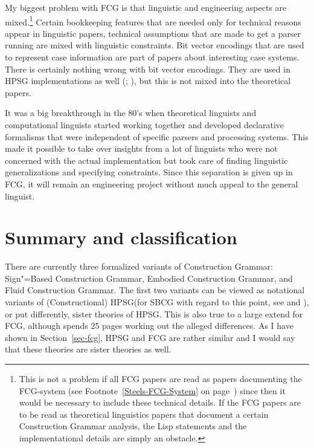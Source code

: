 
\addlines[2]
My biggest problem with FCG is that linguistic and engineering aspects are mixed.\footnote{
This is not a problem if all FCG papers are read as papers documenting the FCG-system (see
Footnote~\ref{Steels-FCG-System} on page~\pageref{Steels-FCG-System}) since then it
would be necessary to include these technical details. If the FCG papers are to be read as
theoretical linguistics papers that document a certain Construction Grammar analysis, the Lisp statements
and the implementational details are simply an obstacle.
} Certain bookkeeping features that are needed only
for technical reasons appear in linguistic papers, technical assumptions that are made to get a
parser running are mixed with linguistic constraints. Bit vector encodings that are used to
represent case information are part of papers about interesting case systems. There is certainly
nothing wrong with bit vector encodings. They are used in HPSG implementations as well
(\citealp[]{Reape91}; \citealp[]{Babel}), but this is
not mixed into the theoretical papers. 

It was a big breakthrough in the 80's when theoretical linguists and computational linguists started
working together and developed declarative formalisms that were independent of specific parsers and
processing systems. This made it possible to take over insights from a lot of linguists who were not
concerned with the actual implementation but took care of finding linguistic generalizations and
specifying constraints. Since this separation is given up in FCG, it will remain an engineering
project without much appeal to the general linguist.%
\indexhpsgend\indexsbcgend



\section{Summary and classification}

\begin{sloppypar}
There are currently three formalized variants of Construction Grammar: Sign"=Based Construction
Grammar, Embodied Construction Grammar, and Fluid Construction Grammar. The first two variants can
be viewed as notational variants of (Constructional) HPSG\indexhpsg (for SBCG with regard to this
point, see  and ), or put differently, sister
theories of HPSG. This is also true to a large extend for FCG, although \citet{vanTrijp2013a} spends
25 pages working out the alleged differences. As I have shown in Section~\ref{sec-fcg}, HPSG and FCG are
rather similar and I would say that these theories are sister theories as well. 
\end{sloppypar}

